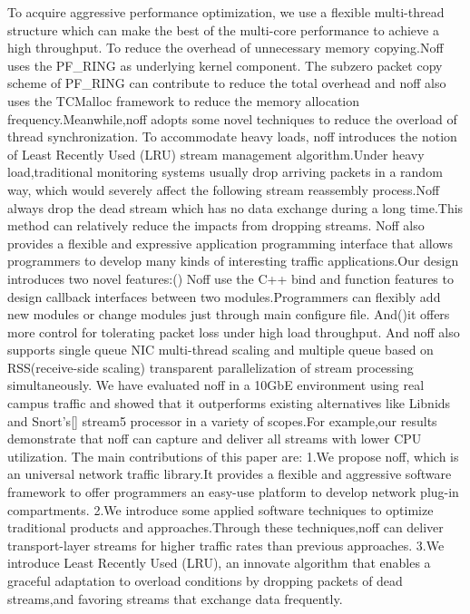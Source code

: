 \documentclass[conference]{IEEEtran}
\begin{document}
\newline\indent To acquire aggressive performance optimization, we use a flexible multi-thread structure which can make the best of the multi-core performance to achieve a high throughput.
\newline\indent To reduce the overhead of unnecessary memory copying.Noff uses the PF\_RING as underlying kernel component. The subzero packet copy scheme of PF\_RING can contribute to reduce the total overhead and noff also uses the TCMalloc\cite{IEEE:6}\cite{IEEE:8} framework to reduce the memory allocation frequency.Meanwhile,noff adopts some novel techniques to reduce the overload of thread synchronization. 
\newline\indent To accommodate heavy loads, noff introduces the notion of Least Recently Used (LRU) stream management algorithm.Under heavy load,traditional monitoring systems usually drop arriving packets in a random way, which would severely affect the following stream reassembly process.Noff always drop the dead stream which has no data exchange during a long time.This method can relatively reduce the impacts from dropping streams.
\newline\indent Noff also provides a flexible and expressive application programming interface that allows programmers to develop many kinds of interesting traffic applications.Our design introduces two novel features:(\uppercase\expandafter{}) Noff use the C++ bind and function features to design callback interfaces between two modules.Programmers can flexibly add new modules or change modules just through main configure file. And(\uppercase\expandafter{})it offers more control for tolerating packet loss under high load throughput. And noff also supports single queue NIC multi-thread scaling and multiple queue based on RSS(receive-side scaling)\cite{IEEE:9} transparent parallelization of stream processing simultaneously.
\newline\indent We have evaluated noff in a 10GbE environment using real campus traffic and showed that it outperforms existing alternatives like Libnids and Snort's[] stream5 processor in a variety of scopes.For example,our results demonstrate that noff can capture and deliver all streams with lower CPU utilization.
The main contributions of this paper are:
\newline 1.We propose noff, which is an universal network traffic library.It provides a flexible and aggressive software framework to offer programmers an easy-use platform to develop network plug-in compartments.
\newline 2.We introduce some applied software techniques to optimize traditional products and approaches.Through these techniques,noff can deliver transport-layer streams for higher traffic rates than previous approaches.
\newline 3.We introduce Least Recently Used (LRU), an innovate algorithm that enables a graceful adaptation to overload conditions by dropping packets of dead streams,and favoring streams that exchange data frequently.
\end{document}
